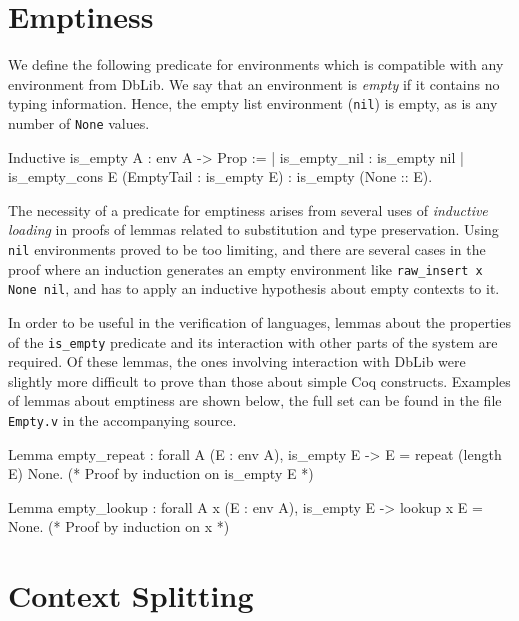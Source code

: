 \documentclass[]{unswthesis}
\let\c\texttt
\let\i\textit
\begin{document}
\section{Emptiness}
\label{sec:emptiness}

We define the following predicate for environments which is compatible with any environment from DbLib. We say that an environment is \i{empty} if it contains no typing information. Hence, the empty list environment (\c{nil}) is empty, as is any number of \c{None} values.

\begin{coqcode}
Inductive is_empty {A} : env A -> Prop :=
  | is_empty_nil : is_empty nil
  | is_empty_cons E (EmptyTail : is_empty E) : is_empty (None :: E).
\end{coqcode}

The necessity of a predicate for emptiness arises from several uses of \i{inductive loading} in proofs of lemmas related to substitution and type preservation. Using \c{nil} environments proved to be too limiting, and there are several cases in the proof where an induction generates an empty environment like \c{raw_insert x None nil}, and has to apply an inductive hypothesis about empty contexts to it.

In order to be useful in the verification of languages, lemmas about the properties of the \c{is_empty} predicate and its interaction with other parts of the system are required. Of these lemmas, the ones involving interaction with DbLib were slightly more difficult to prove than those about simple Coq constructs. Examples of lemmas about emptiness are shown below, the full set can be found in the file \c{Empty.v} in the accompanying source. %

\begin{coqcode}
Lemma empty_repeat : forall A (E : env A),
  is_empty E ->
  E = repeat (length E) None.
(* Proof by induction on is_empty E *)

Lemma empty_lookup : forall A x (E : env A),
  is_empty E ->
  lookup x E = None.
(* Proof by induction on x *)
\end{coqcode}

\section{Context Splitting}
\label{sec:context-splitting}

\end{document}
